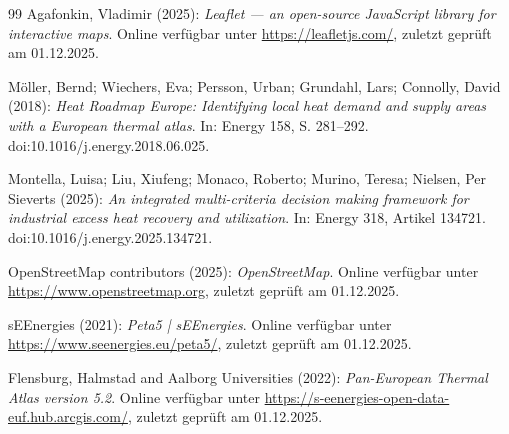 \documentclass[letterpaper,11pt]{article}
\begin{document}
\begin{thebibliography}{99}
Agafonkin, Vladimir (2025):
\textit{Leaflet — an open-source JavaScript library for interactive maps}.
Online verfügbar unter \url{https://leafletjs.com/},
zuletzt geprüft am 01.12.2025.

Möller, Bernd; Wiechers, Eva; Persson, Urban; Grundahl, Lars; Connolly, David (2018):
\textit{Heat Roadmap Europe: Identifying local heat demand and supply areas with a European thermal atlas}.
In: Energy 158, S. 281--292.
doi:10.1016/j.energy.2018.06.025.

Montella, Luisa; Liu, Xiufeng; Monaco, Roberto; Murino, Teresa; Nielsen, Per Sieverts (2025):
\textit{An integrated multi-criteria decision making framework for industrial excess heat recovery and utilization}.
In: Energy 318, Artikel 134721.
doi:10.1016/j.energy.2025.134721.

OpenStreetMap contributors (2025):
\textit{OpenStreetMap}.
Online verfügbar unter \url{https://www.openstreetmap.org},
zuletzt geprüft am 01.12.2025.

sEEnergies (2021):
\textit{Peta5 | sEEnergies}.
Online verfügbar unter \url{https://www.seenergies.eu/peta5/},
zuletzt geprüft am 01.12.2025.

Flensburg, Halmstad and Aalborg Universities (2022):
\textit{Pan-European Thermal Atlas version 5.2}.
Online verfügbar unter \url{https://s-eenergies-open-data-euf.hub.arcgis.com/},
zuletzt geprüft am 01.12.2025.


\end{thebibliography}
\end{document}
